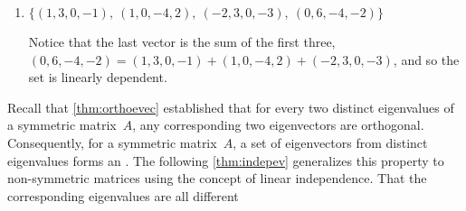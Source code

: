 \begin{example}
\begin{enumerate}
\begin{figbox}
\begin{solution}
\end{solution}
\end{figbox}



\item \(\{(1,3,0,-1),\ (1,0,-4,2),\ (-2,3,0,-3),\ (0,6,-4,-2)\}\)
\begin{solution} 
Notice that the last vector is the sum of the first three, \((0,6,-4,-2)=(1,3,0,-1)+(1,0,-4,2)+(-2,3,0,-3)\), and so the set is linearly dependent. 
\end{solution}


\end{enumerate}
\end{example}




Recall that \cref{thm:orthoevec} established that for every two distinct {eigenvalue}s of a symmetric matrix~\(A\), any corresponding two {eigenvector}s are {orthogonal}.
Consequently, for a symmetric matrix~\(A\), a set of eigenvectors from distinct eigenvalues forms an .
The following \cref{thm:indepev} generalizes this property to non-symmetric matrices using the concept of linear independence.
That the corresponding eigenvalues are all different 



